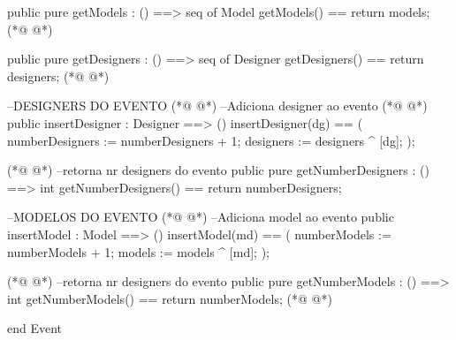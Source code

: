 \begin{vdmpp}[breaklines=true]
  public pure getModels : () ==> seq of Model
     getModels() == return models;
(*@
\label{getCollection:79}
@*)
     
  public pure getDesigners : () ==> seq of Designer
     getDesigners() == return designers;
(*@
\label{getModels:82}
@*)
 
 --DESIGNERS DO EVENTO 
(*@
\label{insertDesigner:84}
@*)
 --Adiciona designer ao evento
(*@
\label{getDesigners:85}
@*)
 public insertDesigner : Designer ==> ()
  insertDesigner(dg) ==
  (
    numberDesigners := numberDesigners + 1;
    designers := designers ^  [dg];
  );
  
(*@
\label{getNumberDesigners:92}
@*)
 --retorna nr designers do evento
  public pure getNumberDesigners : () ==> int
  getNumberDesigners() == return numberDesigners;
  
  --MODELOS DO EVENTO
(*@
\label{insertModel:97}
@*)
  --Adiciona model ao evento
 public insertModel : Model ==> ()
  insertModel(md) ==
  (
    numberModels := numberModels + 1;
    models := models ^  [md];
  );
  
(*@
\label{getNumberModels:105}
@*)
  --retorna nr designers do evento
  public pure getNumberModels : () ==> int
  getNumberModels() == return numberModels;
(*@
\label{printEventInf:108}
@*)
 
end Event
\end{vdmpp}
\bigskip
